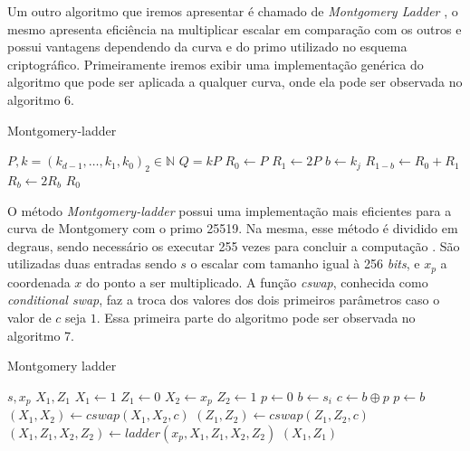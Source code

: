 Um outro algoritmo que iremos apresentar é chamado de \textit{Montgomery Ladder} \cite{Dull:2015:HCM:2834659.2834708}, o mesmo apresenta eficiência na multiplicar escalar em comparação com os outros e possui vantagens dependendo da curva e do primo utilizado no esquema criptográfico. Primeiramente iremos exibir uma implementação genérica do algoritmo que pode ser aplicada a qualquer curva, onde ela pode ser observada no algoritmo 6.

\begin{algorithm}[H]
\caption{Montgomery-ladder}
\begin{algorithmic} 
    \REQUIRE $P, k=(k_{d-1},\ldots,k_1,k_0)_2 \in \mathbb{N}$
    \ENSURE $Q = kP$
    \STATE $R_0 \leftarrow P$
    \STATE $R_1 \leftarrow 2P$
        \STATE $b \leftarrow k_j$
        \STATE $R_{1-b} \leftarrow R_0 + R_1$
        \STATE $R_b \leftarrow 2R_b$
    \ENDFOR
    \RETURN $R_0$
    \end{algorithmic}
\end{algorithm}

O método \textit{Montgomery-ladder} possui uma implementação mais eficientes para a curva de Montgomery com o primo 25519. Na mesma, esse método é dividido em degraus, sendo necessário os executar 255 vezes para concluir a computação \cite{Dull:2015:HCM:2834659.2834708}. São utilizadas duas entradas sendo $s$ o escalar com tamanho igual à 256 \textit{bits}, e $x_p$ a coordenada $x$ do ponto a ser multiplicado. A função \textit{cswap}, conhecida como \textit{conditional swap}, faz a troca dos valores dos dois primeiros parâmetros caso o valor de $c$ seja $1$. Essa primeira parte do algoritmo pode ser observada no algoritmo 7.

\begin{algorithm}[H]
\caption{Montgomery ladder}
\begin{algorithmic} 
    \REQUIRE $s, x_p$
    \ENSURE $X_1, Z_1$
    \STATE $X_1 \leftarrow 1$
    \STATE $Z_1 \leftarrow 0$
    \STATE $X_2 \leftarrow x_p$
    \STATE $Z_2 \leftarrow 1$
    \STATE $p \leftarrow 0$
        \STATE $b \leftarrow s_i$
        \STATE $c \leftarrow b \oplus p$
        \STATE $p \leftarrow b$
        \STATE $(X_1, X_2) \leftarrow cswap(X_1,X_2,c)$
        \STATE $(Z_1,Z_2) \leftarrow cswap(Z_1,Z_2,c)$
        \STATE $(X_1, Z_1, X_2, Z_2) \leftarrow ladder(x_p, X_1, Z_1, X_2, Z_2)$
    \ENDFOR
    \RETURN $(X_1,Z_1)$
    \end{algorithmic}
\end{algorithm}


